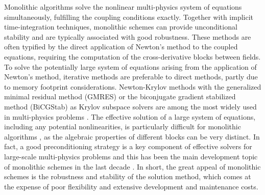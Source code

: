 Monolithic algorithms solve the nonlinear multi-physics system of equations simultaneously, fulfilling the coupling conditions exactly.
Together with implicit time-integration techniques, monolithic schemes can provide unconditional stability and are typically associated with good robustness.
These methods are often typified by the direct application of Newton's method to the coupled equations, requiring the computation of the cross-derivative blocks between fields.
To solve the potentially large system of equations arising from the application of Newton's method, iterative methods are preferable to direct methods, partly due to memory footprint considerations.
Newton-Krylov methods with the generalized minimal residual method (GMRES) or the biconjugate gradient stabilized method (BiCGStab) as Krylov subspace solvers are among the most widely used in multi-physics problems  \citep{hron_monolithic_2006}.
The effective solution of a large system of equations, including any potential nonlinearities, is particularly difficult for monolithic algorithms \citep{danowski_monolithic_2013}, as the algebraic properties of different blocks can be very distinct.
In fact, a good preconditioning strategy is a key component of effective solvers for large-scale multi-physics problems and this has been the main development topic of monolithic schemes in the last decade \citep{tezduyar2006space, lin_parallel_2010, gee_truly_2011, danowski_monolithic_2013, verdugo_unified_2016, mayr_hybrid_2020}.
In short, the great appeal of monolithic schemes is the robustness and stability of the solution method, which comes at the expense of poor flexibility and extensive development and maintenance costs.

